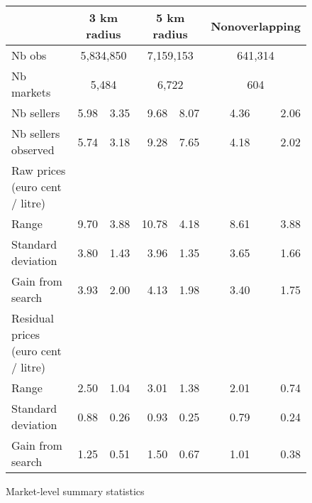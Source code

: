 \documentclass[english]{article}
\begin{document}
{\begin{figure}[!h]
  \caption{Market-level summary statistics}
    \begin{tabular}{lrrrrrr}
    \hline
    \hline
    & \multicolumn{2}{c}{3 km radius} & \multicolumn{2}{c}{5 km radius} & \multicolumn{2}{c}{Nonoverlapping} \\
    \hline
    Nb obs & \multicolumn{2}{c}{5,834,850} & \multicolumn{2}{c}{7,159,153} & \multicolumn{2}{c}{641,314} \\
    Nb markets & \multicolumn{2}{c}{5,484} & \multicolumn{2}{c}{6,722} & \multicolumn{2}{c}{604} \\
    Nb sellers & 5.98  & 3.35  & 9.68  & 8.07  & 4.36  & 2.06 \\
    Nb sellers observed & 5.74  & 3.18  & 9.28  & 7.65  & 4.18  & 2.02 \\
    \hline
    Raw prices (euro cent / litre) &       &       &       &       &       &  \\
    Range & 9.70  & 3.88  & 10.78 & 4.18  & 8.61  & 3.88 \\
    Standard deviation & 3.80  & 1.43  & 3.96  & 1.35  & 3.65  & 1.66 \\
    Gain from search & 3.93  & 2.00  & 4.13  & 1.98  & 3.40  & 1.75 \\
    \hline
    Residual prices (euro cent / litre) &       &       &       &       &       &  \\
    Range & 2.50  & 1.04  & 3.01  & 1.38  & 2.01  & 0.74 \\
    Standard deviation & 0.88  & 0.26  & 0.93  & 0.25  & 0.79  & 0.24 \\
    Gain from search & 1.25  & 0.51  & 1.50  & 0.67  & 1.01  & 0.38 \\
    \hline
    \hline
\end{tabular}
\label{tab:station_stats_des}
\end{figure}

}
\end{document}
